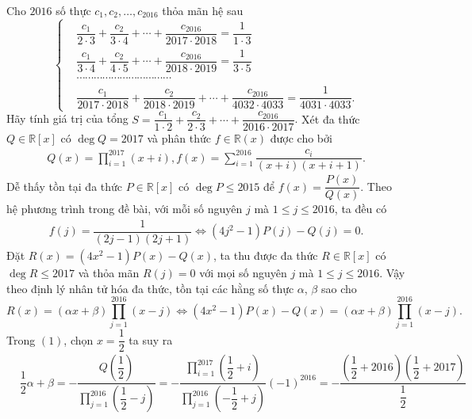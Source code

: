 \begin{bt}%
 Cho $2016$ số thực $c_1,c_2,\ldots,c_{2016}$ thỏa mãn hệ sau
 $$\left\{\begin{aligned}
  &\dfrac{c_1}{2\cdot3} + \dfrac{c_2}{3\cdot4} + \cdots + \dfrac{c_{2016}}{2017\cdot2018}=\dfrac{1}{1\cdot3}\\
  &\dfrac{c_1}{3\cdot4} + \dfrac{c_2}{4\cdot5} + \cdots + \dfrac{c_{2016}}{2018\cdot2019}=\dfrac{1}{3\cdot5}\\
  &\cdots\cdots\cdots \cdots\cdots\cdots\cdots\cdots\cdots\cdots\cdots\\
  &\dfrac{c_1}{2017\cdot2018} + \dfrac{c_2}{2018\cdot2019} + \cdots + \dfrac{c_{2016}}{4032\cdot4033}=\dfrac{1}{4031\cdot4033}.
 \end{aligned}\right.$$
 Hãy tính giá trị của tổng $S=\dfrac{c_1}{1\cdot2}+\dfrac{c_2}{2\cdot3}+\cdots+\dfrac{c_{2016}}{2016\cdot2017}$.
 \loigiai
  {
  Xét đa thức $Q\in\mathbb{R}[x]$ có $\deg Q=2017$ và phân thức $f\in\mathbb{R}(x)$ được cho bởi
  \begin{eqnarray*}
   Q(x) = \prod\limits_{i=1}^{2017}(x+i), f(x)= \sum\limits_{i=1}^{2016}\dfrac{c_i}{(x+i)(x+i+1)}.
  \end{eqnarray*}
  Dễ thấy tồn tại đa thức $P\in\mathbb{R}[x]$ có $\deg P \leq 2015$ để $f(x)=\dfrac{P(x)}{Q(x)}$. Theo hệ phương trình trong đề bài, với mỗi số nguyên $j$ mà $1 \leq j \leq 2016$, ta đều có
  \begin{eqnarray*}
   f(j)=\dfrac{1}{(2j-1)(2j+1)} \Leftrightarrow (4j^2-1)P(j)-Q(j)=0.
  \end{eqnarray*}
  Đặt $R(x)= (4x^2-1)P(x)-Q(x)$, ta thu được đa thức $R\in\mathbb{R}[x]$ có $\deg R \leq 2017$ và thỏa mãn $R(j)=0$ với mọi số nguyên $j$ mà $1 \leq j \leq 2016$. Vậy theo định lý nhân tử hóa đa thức, tồn tại các hằng số thực $\alpha$, $\beta$ sao cho
  \begin{equation}
   R(x)= (\alpha x+\beta)\prod\limits_{j=1}^{2016}(x-j) \Leftrightarrow (4x^2-1)P(x)-Q(x) = (\alpha x+\beta)\prod\limits_{j=1}^{2016}(x-j). \tag{$1$}
  \end{equation}
  Trong $(1)$, chọn $x=\dfrac{1}{2}$ ta suy ra
  \begin{align*}
   &\dfrac{1}{2}\alpha + \beta =-\dfrac{Q\left(\dfrac{1}{2}\right)}{\displaystyle\prod\limits_{j=1}^{2016}\left(\dfrac{1}{2}-j\right)} = -\dfrac{\displaystyle\prod\limits_{i=1}^{2017}\left(\dfrac{1}{2}+i\right)}{\displaystyle\prod\limits_{j=1}^{2016}\left(-\dfrac{1}{2}+j\right)}(-1)^{2016} = -\dfrac{\left(\dfrac{1}{2}+2016\right)\left(\dfrac{1}{2}+2017\right)}{\dfrac{1}{2}}\\

\end{align*}}
\end{bt}
